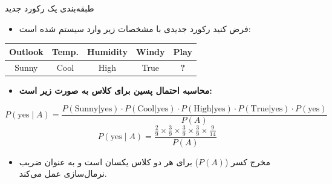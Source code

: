 \begin{frame}{طبقه‌بندی یک رکورد جدید}{}
  \begin{itemize}
    \item فرض کنید رکورد جدیدی با مشخصات زیر وارد سیستم شده است:
  \end{itemize}
  \vspace{-0.1cm}
  \begin{center}
    \small
    \begin{latin}
    \begin{tabular}{|c|c|c|c|c|}
      \hline
      \textbf{Outlook} & \textbf{Temp.} & \textbf{Humidity} & \textbf{Windy} & \textbf{Play} \\
      \hline
      Sunny & Cool & High & True & \textbf{?} \\
      \hline
    \end{tabular}
    \end{latin}
  \end{center}
  \vspace{0.1cm}
  \begin{itemize}
    \item \textbf{محاسبه احتمال پسین برای کلاس  به صورت زیر است:}
  \end{itemize}
  \vspace{-0.1cm}
  {\small
  \[
    P(\text{yes} \mid A) = \frac{P(\text{Sunny}|\text{yes}) \cdot P(\text{Cool}|\text{yes}) \cdot P(\text{High}|\text{yes}) \cdot P(\text{True}|\text{yes}) \cdot P(\text{yes})}{P(A)}
  \]}
  \[
    P(\text{yes} \mid A) = \frac{\frac{2}{9} \times \frac{3}{9} \times \frac{3}{9} \times \frac{3}{9} \times \frac{9}{14}}{P(A)}
  \]
  \begin{itemize}
    \item مخرج کسر ($P(A)$) برای هر دو کلاس یکسان است و به عنوان ضریب نرمال‌سازی عمل می‌کند.
  \end{itemize}
\end{frame}


